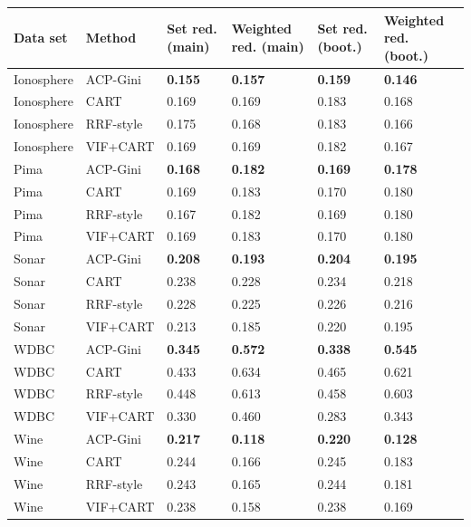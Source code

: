 \begin{tabular}{llllll}
\toprule
Data set & Method & Set red. (main) & Weighted red. (main) & Set red. (boot.) & Weighted red. (boot.) \\
\midrule
Ionosphere & ACP-Gini & \textbf{0.155} & \textbf{0.157} & \textbf{0.159} & \textbf{0.146} \\
Ionosphere & CART & 0.169 & 0.169 & 0.183 & 0.168 \\
Ionosphere & RRF-style & 0.175 & 0.168 & 0.183 & 0.166 \\
Ionosphere & VIF+CART & 0.169 & 0.169 & 0.182 & 0.167 \\
Pima & ACP-Gini & \textbf{0.168} & \textbf{0.182} & \textbf{0.169} & \textbf{0.178} \\
Pima & CART & 0.169 & 0.183 & 0.170 & 0.180 \\
Pima & RRF-style & 0.167 & 0.182 & 0.169 & 0.180 \\
Pima & VIF+CART & 0.169 & 0.183 & 0.170 & 0.180 \\
Sonar & ACP-Gini & \textbf{0.208} & \textbf{0.193} & \textbf{0.204} & \textbf{0.195} \\
Sonar & CART & 0.238 & 0.228 & 0.234 & 0.218 \\
Sonar & RRF-style & 0.228 & 0.225 & 0.226 & 0.216 \\
Sonar & VIF+CART & 0.213 & 0.185 & 0.220 & 0.195 \\
WDBC & ACP-Gini & \textbf{0.345} & \textbf{0.572} & \textbf{0.338} & \textbf{0.545} \\
WDBC & CART & 0.433 & 0.634 & 0.465 & 0.621 \\
WDBC & RRF-style & 0.448 & 0.613 & 0.458 & 0.603 \\
WDBC & VIF+CART & 0.330 & 0.460 & 0.283 & 0.343 \\
Wine & ACP-Gini & \textbf{0.217} & \textbf{0.118} & \textbf{0.220} & \textbf{0.128} \\
Wine & CART & 0.244 & 0.166 & 0.245 & 0.183 \\
Wine & RRF-style & 0.243 & 0.165 & 0.244 & 0.181 \\
Wine & VIF+CART & 0.238 & 0.158 & 0.238 & 0.169 \\
\bottomrule
\end{tabular}
